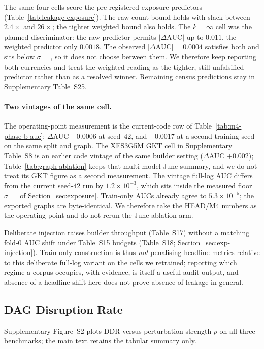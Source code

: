 \documentclass[preprint,10pt,doubleblind]{elsarticle}
\newcommand{\DDR}{\textsc{DDR}}
\begin{document}
The same four cells score the pre-registered exposure predictors
(Table~\ref{tab:leakage-exposure}). The raw count bound holds with slack
between $2.4\times$ and $26\times$; the tighter weighted bound also holds.
The $k{=}\infty$ cell was the planned discriminator: the raw predictor
permits $|\Delta\text{AUC}|$ up to $0.011$, the weighted predictor only
$0.0018$. The observed $|\Delta\text{AUC}|{=}0.0004$ satisfies both and sits
below $\sigma{=}$\NoiseFloorPrimaryMeas{}, so it does not choose between
them. We therefore keep reporting both currencies and treat the weighted
reading as the tighter, still-unfalsified predictor rather than as a
resolved winner. Remaining census predictions stay in Supplementary
Table~S25.

\paragraph{Two vintages of the same cell.}
The operating-point measurement is the current-code row of
Table~\ref{tab:m4-phase-b-auc}: $\Delta$AUC ${+}0.0006$ at seed~$42$, and
${+}0.0017$ at a second training seed on the same split and graph.
The XES3G5M GKT cell in Supplementary Table~S8 is an earlier code vintage of
the same builder setting ($\Delta$AUC ${+}0.002$);
Table~\ref{tab:graph-ablation} keeps that multi-model June summary, and we
do not treat its GKT figure as a second measurement. The vintage full-log
AUC differs from the current seed-$42$ run by $1.2\times10^{-3}$, which sits
inside the measured floor $\sigma{=}$\NoiseFloorPrimaryMeas{} of
Section~\ref{sec:exposure}. Train-only AUCs already agree to
$5.3\times10^{-5}$; the exported graphs are byte-identical. We therefore take
the HEAD/M4 numbers as the operating point and do not rerun the June
ablation arm.




Deliberate injection raises builder throughput (Table~S17) without a
matching fold-0 AUC shift under Table~S15 budgets (Table~S18;
Section~\ref{sec:exp-injection}). Train-only construction is
thus \emph{not} penalising headline metrics relative to this deliberate
full-log variant on the cells we retrained; reporting which regime a corpus occupies,
with evidence, is itself a useful audit output, and absence of a headline
shift here does not prove absence of leakage in general.

\subsection{DAG Disruption Rate}
\label{sec:exp-ddr}
Supplementary Figure~S2 plots \DDR{} versus
perturbation strength $p$ on all three benchmarks; the main text retains the
tabular summary only.
\end{document}
